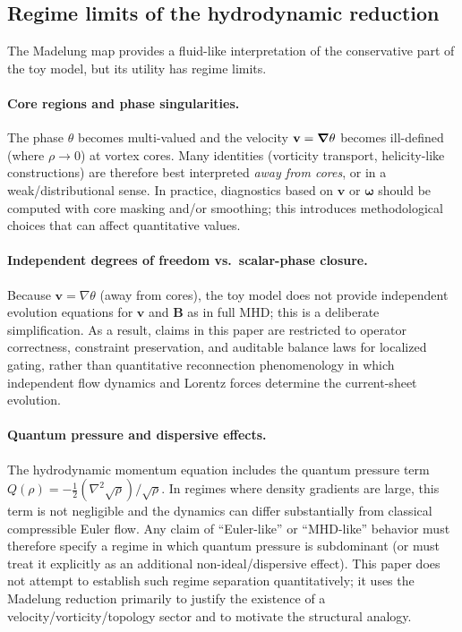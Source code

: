 \documentclass[11pt]{article}
\theoremstyle{plain}
\theoremstyle{definition}
\theoremstyle{remark}
\newcommand{\B}{\mathbf{B}}
\newcommand{\vfield}{\mathbf{v}}
\newcommand{\omegaV}{\boldsymbol{\omega}}
\begin{document}
\subsection{Regime limits of the hydrodynamic reduction}\label{sec:limitations_madelung}
The Madelung map provides a fluid-like interpretation of the conservative part of the toy model, but
its utility has regime limits.

\paragraph{Core regions and phase singularities.}
The phase $\theta$ becomes multi-valued and the velocity $\vfield=\grad\theta$ becomes ill-defined
(where $\rho\to 0$) at vortex cores. Many identities (vorticity transport, helicity-like constructions)
are therefore best interpreted \emph{away from cores}, or in a weak/distributional sense. In practice,
diagnostics based on $\vfield$ or $\omegaV$ should be computed with core masking and/or smoothing; this
introduces methodological choices that can affect quantitative values.

\paragraph{Independent degrees of freedom vs.\ scalar-phase closure.}
Because $\vfield=\nabla\theta$ (away from cores), the toy model does not provide independent evolution equations for $\vfield$ and $\B$ as in full MHD; this is a deliberate simplification. As a result, claims in this paper are restricted to operator correctness, constraint preservation, and auditable balance laws for localized gating, rather than quantitative reconnection phenomenology in which independent flow dynamics and Lorentz forces determine the current-sheet evolution.

\paragraph{Quantum pressure and dispersive effects.}
The hydrodynamic momentum equation includes the quantum pressure term
$Q(\rho)=-\frac12(\nabla^2\sqrt{\rho})/\sqrt{\rho}$. In regimes where density gradients are large, this
term is not negligible and the dynamics can differ substantially from classical compressible Euler
flow. Any claim of ``Euler-like'' or ``MHD-like'' behavior must therefore specify a regime in which
quantum pressure is subdominant (or must treat it explicitly as an additional non-ideal/dispersive
effect). This paper does not attempt to establish such regime separation quantitatively; it uses the
Madelung reduction primarily to justify the existence of a velocity/vorticity/topology sector and to
motivate the structural analogy.
\end{document}
